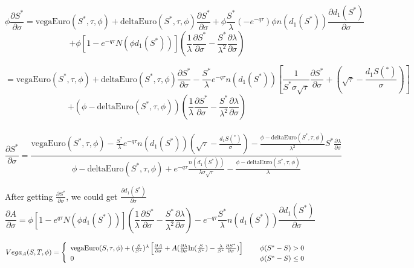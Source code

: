 \documentclass[preprint,12pt,1p]{elsarticle}
\begin{document}
$$\phi \frac{\partial S^*}{\partial \sigma} = \text{vegaEuro}(S^*,\tau,\phi) + \text{deltaEuro}(S^*,\tau,\phi)\frac{\partial S^*}{\partial \sigma} + \phi \frac{S^*}{\lambda}(-e^{-q\tau})\phi n(d_1(S^*))\frac{\partial d_1(S^*)}{\partial \sigma} $$ 
$$+ \phi[1-e^{-q\tau}N(\phi d_1(S^*))](\frac{1}{\lambda}\frac{\partial S^*}{\partial \sigma} - \frac{S^*}{\lambda^2} \frac{\partial \lambda}{\partial \sigma})$$

$$ = \text{vegaEuro}(S^*,\tau,\phi) + \text{deltaEuro}(S^*,\tau,\phi) \frac{\partial S^*}{\partial \sigma} - \frac{S^*}{\lambda}e^{-q\tau}n(d_1(S^*))[\frac{1}{S^*\sigma \sqrt{\tau}}\frac{\partial S^*}{\partial \sigma} + (\sqrt{\tau} - \frac{d_1S(^*)}{\sigma})]$$
$$+(\phi - \text{deltaEuro}(S^*,\tau,\phi))(\frac{1}{\lambda}\frac{\partial S^*}{\partial \sigma} - \frac{S^*}{\lambda^2} \frac{\partial \lambda}{\partial \sigma})$$\\[0.3pt]
$$\frac{\partial S^*}{\partial \sigma} = \frac{ \text{vegaEuro}(S^*,\tau,\phi) - \frac{S^*}{\lambda}e^{-q\tau}n(d_1(S^*))(\sqrt{\tau} - \frac{d_1S(^*)}{\sigma})- \frac{\phi - \text{deltaEuro}(S^*,\tau,\phi)}{\lambda^2}S^*\frac{\partial \lambda}{\partial \sigma}}{\phi - \text{deltaEuro}(S^*,\tau,\phi) + e^{-q\tau}\frac{n(d_1(S^*))}{\lambda \sigma \sqrt{\tau}} - \frac{\phi - \text{deltaEuro}(S^*,\tau,\phi)}{\lambda}}$$

After getting $\frac{\partial S^*}{\partial \sigma}$, we could get $\frac{\partial d_1(S^*)}{\partial \sigma} $\\[6pt]

$$\frac{\partial A}{\partial \sigma} = \phi[1-e^{q\tau}N(\phi d_1(S^*))](\frac{1}{\lambda} \frac{\partial S^*}{\partial \sigma} - \frac{S^*}{\lambda^2} \frac{\partial \lambda}{\partial \sigma}) - e^{-q\tau}\frac{S^*}{\lambda}n(d_1(S^*))\frac{\partial d_1(S^*)}{\partial \sigma}$$

\[   Vega_A(S, T, \phi) = \left\{ 
\begin{array}{ll}
      \text{vegaEuro}(S, \tau, \phi) + (\frac{S}{S^*})^{\lambda} \left[\frac{\partial A}{\partial \sigma} +A(\frac{\partial \lambda}{\partial \sigma} \text{ln}(\frac{S}{S^*}) -\frac{\lambda}{S^*} \frac{\partial S^*}{\partial \sigma})\right] & \hspace{0.5cm}  \phi(S^* - S) > 0\\
      0 & \hspace{0.5cm}  \phi(S^* - S) \leq 0\\
\end{array} 
\right. \]

\clearpage
\end{document}

